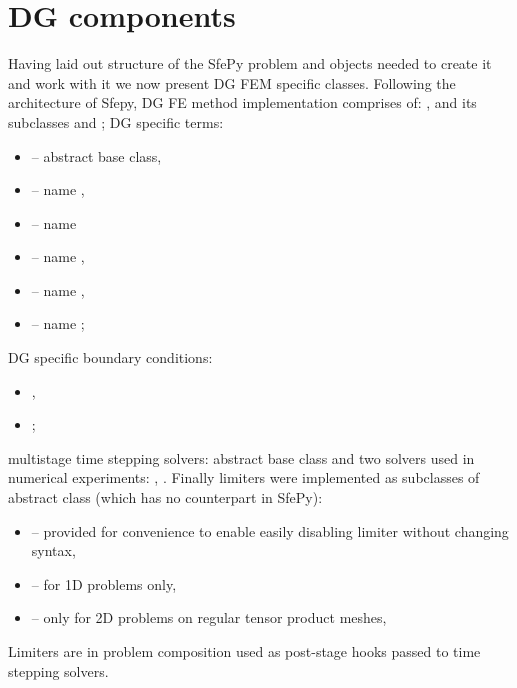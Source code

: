 \section{DG components}
Having laid out structure of the SfePy problem and objects needed to create it and work 
with it we now present DG FEM
specific classes. Following the architecture of Sfepy, DG FE method implementation 
comprises 
of: , 
 and its subclasses  
and 
;
DG specific terms: 
\begin{itemize}
	\item {} -- abstract base class,
	\item {} -- name ,
	\item {} -- name
	\item {} -- name ,
	\item {} -- name ,
	\item {} --  name 
	;
\end{itemize}
DG specific boundary conditions:
\begin{itemize}
	\item {},
	\item {};
\end{itemize}
multistage time stepping solvers: abstract base class  
and two solvers used in numerical 
experiments: , . Finally limiters 
were implemented as subclasses of  abstract class (which has 
no counterpart in SfePy):
\begin{itemize}
	\item {} -- provided for convenience to enable 
	easily disabling limiter without changing 
	syntax,
	\item {} -- for 1D problems only,
	\item {} -- only for 2D problems on regular tensor product 
	meshes,
\end{itemize} 
Limiters are in problem composition used as post-stage hooks passed to time 
stepping solvers.
